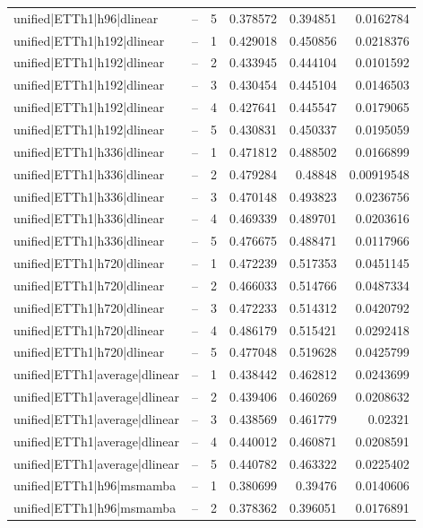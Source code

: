 \begin{longtable}{llrrrr}
unified|ETTh1|h96|dlinear & -- & 5 & 0.378572 & 0.394851 & 0.0162784 \\
unified|ETTh1|h192|dlinear & -- & 1 & 0.429018 & 0.450856 & 0.0218376 \\
unified|ETTh1|h192|dlinear & -- & 2 & 0.433945 & 0.444104 & 0.0101592 \\
unified|ETTh1|h192|dlinear & -- & 3 & 0.430454 & 0.445104 & 0.0146503 \\
unified|ETTh1|h192|dlinear & -- & 4 & 0.427641 & 0.445547 & 0.0179065 \\
unified|ETTh1|h192|dlinear & -- & 5 & 0.430831 & 0.450337 & 0.0195059 \\
unified|ETTh1|h336|dlinear & -- & 1 & 0.471812 & 0.488502 & 0.0166899 \\
unified|ETTh1|h336|dlinear & -- & 2 & 0.479284 & 0.48848 & 0.00919548 \\
unified|ETTh1|h336|dlinear & -- & 3 & 0.470148 & 0.493823 & 0.0236756 \\
unified|ETTh1|h336|dlinear & -- & 4 & 0.469339 & 0.489701 & 0.0203616 \\
unified|ETTh1|h336|dlinear & -- & 5 & 0.476675 & 0.488471 & 0.0117966 \\
unified|ETTh1|h720|dlinear & -- & 1 & 0.472239 & 0.517353 & 0.0451145 \\
unified|ETTh1|h720|dlinear & -- & 2 & 0.466033 & 0.514766 & 0.0487334 \\
unified|ETTh1|h720|dlinear & -- & 3 & 0.472233 & 0.514312 & 0.0420792 \\
unified|ETTh1|h720|dlinear & -- & 4 & 0.486179 & 0.515421 & 0.0292418 \\
unified|ETTh1|h720|dlinear & -- & 5 & 0.477048 & 0.519628 & 0.0425799 \\
unified|ETTh1|average|dlinear & -- & 1 & 0.438442 & 0.462812 & 0.0243699 \\
unified|ETTh1|average|dlinear & -- & 2 & 0.439406 & 0.460269 & 0.0208632 \\
unified|ETTh1|average|dlinear & -- & 3 & 0.438569 & 0.461779 & 0.02321 \\
unified|ETTh1|average|dlinear & -- & 4 & 0.440012 & 0.460871 & 0.0208591 \\
unified|ETTh1|average|dlinear & -- & 5 & 0.440782 & 0.463322 & 0.0225402 \\
unified|ETTh1|h96|msmamba & -- & 1 & 0.380699 & 0.39476 & 0.0140606 \\
unified|ETTh1|h96|msmamba & -- & 2 & 0.378362 & 0.396051 & 0.0176891 \\

\end{longtable}
